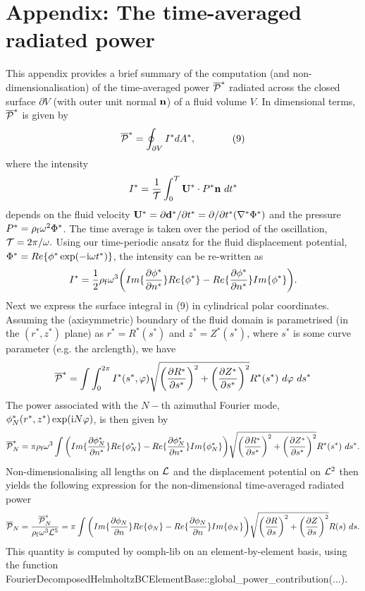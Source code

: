 \hypertarget{index_appendix}{}\section{Appendix\+: The time-\/averaged radiated power}\label{index_appendix}
This appendix provides a brief summary of the computation (and non-\/dimensionalisation) of the time-\/averaged power $ \overline{\cal P }^* $ radiated across the closed surface $ \partial V $ (with outer unit normal $ {\bf n} $) of a fluid volume $ V $. In dimensional terms, $ \overline{\cal P }^* $ is given by \[ \overline{\cal P }^* = \oint_{\partial V} I^* dA^*, \ \ \ \ \ \ \ \ \ \ \ (9) \] where the intensity \[ I^* = \frac{1}{{\cal T}} \int_0^{\cal T} {\bf U}^* \cdot P^* {\bf n} \ dt^* \] depends on the fluid velocity $ {\bf U}^* = \partial {\bf d}^*/\partial t^* = \partial/\partial t^* (\nabla^* \Phi^*) $ and the pressure $ P^* = \rho_{\rm f} \omega^2 \Phi^* $. The time average is taken over the period of the oscillation, $ {\cal T} = 2\pi/\omega. $ Using our time-\/periodic ansatz for the fluid displacement potential, $ \Phi^* = Re\{ \phi^* \exp(-{\rm i}\omega t^*) \} $, the intensity can be re-\/written as \[ I^* = \frac{1}{2} \rho_{\rm f} \omega^3 \bigg( Im \{\frac{\partial \phi^*}{\partial n^*} \} Re\{\phi^* \} - Re \{\frac{\partial \phi^*}{\partial n^*} \} Im\{\phi^* \} \bigg). \] Next we express the surface integral in (9) in cylindrical polar coordinates. Assuming the (axisymmetric) boundary of the fluid domain is parametrised (in the $ (r^*,z^*)$ plane) as $ r^* = R^*(s^*)$ and $ z^* = Z^*(s^*)$, where $ s^* $ is some curve parameter (e.\+g. the arclength), we have \[ \overline{\cal P }^* = \int \int_0^{2\pi} I^*(s^*,\varphi) \sqrt{ \left(\frac{\partial R^*}{\partial s^*}\right)^2 + \left(\frac{\partial Z^*}{\partial s^*}\right)^2 } R^*(s^*) \ d\varphi \ ds^* \] The power associated with the $ N-$th azimuthal Fourier mode, $ \phi^*_N(r^*,z^*) \exp({\rm i}N \varphi) $, is then given by \[ \overline{\cal P }^*_N = \pi \rho_{\rm f} \omega^3 \int \bigg( Im \{\frac{\partial \phi_N^*}{\partial n^*} \} Re\{\phi_N^* \} - Re \{\frac{\partial \phi_N^*}{\partial n^*} \} Im\{\phi_N^* \} \bigg) \sqrt{ \left(\frac{\partial R^*}{\partial s^*}\right)^2 + \left(\frac{\partial Z^*}{\partial s^*}\right)^2 } R^*(s^*) \ ds^*. \] Non-\/dimensionalising all lengths on $ {\cal L}$ and the displacement potential on $ {\cal L}^2 $ then yields the following expression for the non-\/dimensional time-\/averaged radiated power \[ \overline{\cal P }_N = \frac{\overline{\cal P }^*_N}{\rho_{\rm f} \omega^3 {\cal L}^5} = \pi \int \bigg( Im \{\frac{\partial \phi_N}{\partial n} \} Re\{\phi_N \} - Re \{\frac{\partial \phi_N}{\partial n} \} Im\{\phi_N \} \bigg) \sqrt{ \left(\frac{\partial R}{\partial s}\right)^2 + \left(\frac{\partial Z}{\partial s}\right)^2 } R(s) \ ds. \] This quantity is computed by {\ttfamily oomph-\/lib} on an element-\/by-\/element basis, using the function {\ttfamily Fourier\+Decomposed\+Helmholtz\+B\+C\+Element\+Base\+::global\+\_\+power\+\_\+contribution}(...).


